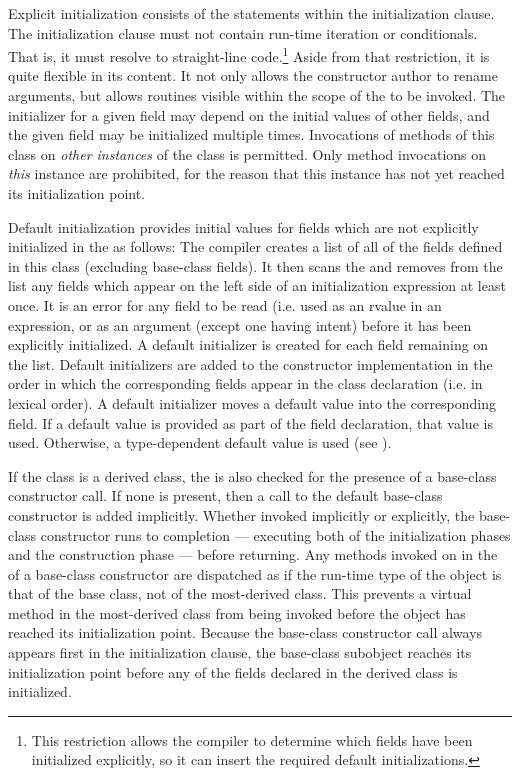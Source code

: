 Explicit initialization consists of the statements within the initialization
clause.  The initialization clause must not contain run-time iteration or
conditionals.  That is, it must resolve to straight-line code.\footnote{This
restriction allows the compiler to determine which fields have been initialized
explicitly, so it can insert the required default initializations.}
Aside from that restriction, it is quite flexible in its content.  It not only allows the constructor
author to rename arguments, but allows routines visible within the scope of
the  to be invoked.  The initializer for a given
field may depend on the initial values of other fields, and the given field may be
initialized multiple times.  Invocations of methods of this
class on \emph{other instances} of the class is permitted.  Only method
invocations on \emph{this} instance are prohibited, for the reason that this
instance has not yet reached its initialization point.

Default initialization provides initial values for fields which are not
explicitly initialized in the  as follows:  The
compiler creates a list of all of the fields defined in this class (excluding
base-class fields).  It then scans the  and removes
from the list any fields which appear on the left side of an initialization
expression at least once.  It is an error for any field to be read (i.e. used as
an rvalue in an expression, or as an argument (except one having  intent)
before it has been explicitly initialized.  
A default initializer is created for each field remaining on the list.  Default
initializers are added to the constructor implementation in the order in which
the corresponding fields appear in the class declaration (i.e. in lexical
order).  A default initializer moves a default value into the corresponding
field.  If a default value is provided as part of the field declaration, that
value is used.  Otherwise, a type-dependent default value is used
(see ).

If the class is a derived class, the  is also
checked for the presence of a base-class constructor call.  If none is present,
then a call to the default base-class constructor is added implicitly.
Whether invoked implicitly or explicitly, the base-class constructor runs to
completion --- executing both of the initialization phases and the construction
phase --- before returning.  Any methods invoked on  in
the  of a base-class constructor are dispatched as if the
run-time type of the object is that of the base class, not of the most-derived
class.  This prevents a virtual method in the most-derived class from being
invoked before the object has reached its initialization point.  Because the
base-class constructor call always appears first in the initialization clause,
the base-class subobject reaches its initialization point before any of the
fields declared in the derived class is initialized.

